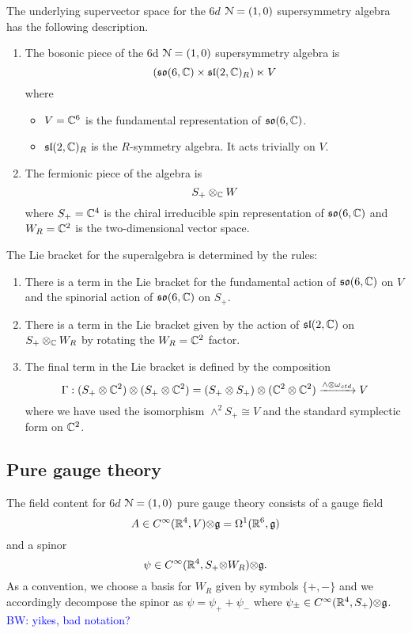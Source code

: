 \documentclass[10pt, oneside]{article}
\title{6d $\cN = (1,0)}
\author{Brian}
\date{\today}
\def\brian{\textcolor{blue}{BW: }\textcolor{blue}}
\def\tensor{{\otimes}}
\begin{document}
The underlying supervector space for the $6d$ $\mc N = (1,0)$ supersymmetry algebra has the following description. 
\begin{enumerate}
\item The bosonic piece of the 6d $\mc N = (1,0)$ supersymmetry algebra is
\[
(\mf {so} (6, \CC) \times \mf {sl}(2, \CC)_R) \ltimes V
\]
where 
\begin{itemize}
\item $V = \CC^6$ is the fundamental representation of $\mf {so}(6,\CC)$.
\item $\mf {sl}(2, \CC)_R$ is the $R$-symmetry algebra.
It acts trivially on $V$. 
\end{itemize}
\item The fermionic piece of the algebra is 
\[
S_+ \otimes_\CC W
\]
where $S_+ = \CC^4$ is the chiral irreducible spin representation of $\so(6, \CC)$ and $W_R = \CC^2$ is the two-dimensional vector space. 
\end{enumerate}

The Lie bracket for the superalgebra is determined by the rules:
\begin{enumerate}
\item
There is a term in the Lie bracket for the fundamental action of $\mathfrak{so}(6, \mathbb{C})$ on $V$ and the spinorial action of $\mathfrak{so}(6,\mathbb{C})$ on $S_+$. 
\item 
There is a term in the Lie bracket given by the action of $\mathfrak{sl} (2,\mathbb{C})$ on $S_+ \otimes_{\mathbb{C}} W_R$ by rotating the $W_R = \mathbb{C}^2$ factor. 
\item
The final term in the Lie bracket is defined by the composition
\[
\Gamma : (S_+ \otimes \mathbb{C}^2) \otimes (S_+ \otimes \mathbb{C}^2) = (S_+ \otimes S_+) \otimes (\mathbb{C}^2 \otimes \mathbb{C}^2) \xrightarrow{\wedge \otimes \omega_{std}} V 
\]
where we have used the isomorphism $\wedge^2 S_+ \cong V$ and the standard symplectic form on $\mathbb{C}^2$. 
\end{enumerate}

\subsection{Pure gauge theory}

The field content for $6d$ $\mathcal{N} = (1,0)$ pure gauge theory consists of a gauge field
\[
A \in C^\infty(\RR^4, V) \tensor \mf g = \Omega^1(\RR^6, \mf g)
\]
and a spinor
\[
\psi \in C^\infty(\RR^4, S_+ \tensor W_R) \tensor \mf g .
\]
As a convention, we choose a basis for $W_R$ given by symbols $\{+, -\}$ and we accordingly decompose the spinor as $\psi = \psi_+ + \psi_-$ where $\psi_{\pm} \in C^\infty(\RR^4, S_+) \tensor \mf g$.
\brian{yikes, bad notation?}
\end{document}
